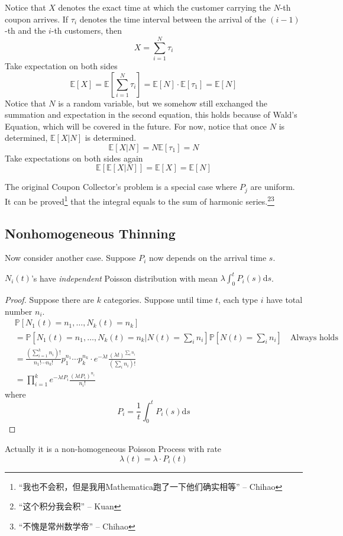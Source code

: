         Notice that $X$ denotes the exact time at which the customer carrying the $N$-th coupon arrives. If $\tau_i$ denotes the time interval between the arrival of the $(i-1)$-th and the $i$-th customers, then
        \[ X = \sum_{i=1}^N \tau_i \]
        Take expectation on both sides
        \[ \mathbb{E}[X] = \mathbb{E}\left[ \sum_{i=1}^N \tau_i \right] = \mathbb{E}[N]\cdot\mathbb{E}[\tau_1] = \mathbb{E}[N] \]
        Notice that $N$ is a random variable, but we somehow still exchanged the summation and expectation in the second equation, this holds because of Wald's Equation, which will be covered in the future. For now, notice that once $N$ is determined, $\mathbb{E}[X|N]$ is determined.
        \[ \mathbb{E}[X|N] = N\mathbb{E}[\tau_1] = N \]
        Take expectations on both sides again
        \[ \mathbb{E}[\mathbb{E}[X|N]] = \mathbb{E}[X] = \mathbb{E}[N] \]
        \begin{remark}
            The original Coupon Collector's problem is a special case where $P_j$ are uniform. It can be proved\footnote{“我也不会积，但是我用Mathematica跑了一下他们确实相等” -- Chihao} that the integral equals to the sum of harmonic series.\footnote{“这个积分我会积” -- Kuan}\footnote{“不愧是常州数学帝” -- Chihao}
        \end{remark}

    \subsection{Nonhomogeneous Thinning}
        Now consider another case. Suppose $P_i$ now depends on the arrival time $s$.
        \begin{theorem}
            \label{thm:NonhomogeneousThinning}
            $N_i(t)$'s have \emph{independent} Poisson distribution with mean $\lambda\int_0^t P_i(s)\mathrm{d}s$.
        \end{theorem}
        \begin{proof}
            Suppose there are $k$ categories. Suppose until time $t$, each type $i$ have total number $n_i$.
            \begin{align*}
                &\mathbb{P}[N_1(t)=n_1,\dots,N_k(t)=n_k]\\
                &=\mathbb{P}\left[ N_1(t)=n_1,\dots,N_k(t)=n_k|N(t)=\sum_i n_i \right]\mathbb{P}\left[ N(t) = \sum_i n_i \right] \quad \text{Always holds}\\
                &= \frac{\left(\sum_{i=1}^kn_i\right)!}{n_1!\cdots n_k!}p_1^{n_1}\cdots p_k^{n_k} \cdot e^{-\lambda t}\frac{(\lambda t)^{\sum_in_i}}{(\sum_i n_i)!}\\
                &= \prod_{i=1}^k e^{-\lambda t P_i} \frac{(\lambda t P_i)^{n_i}}{n_i!}
            \end{align*}
            where
            \[ P_i = \frac{1}{t}\int_0^t P_i(s)\mathrm{d}s \]
        \end{proof}
        \begin{remark}
            Actually it is a non-homogeneous Poisson Process with rate
            \[ \lambda(t) = \lambda\cdot P_i(t) \]
        \end{remark}

